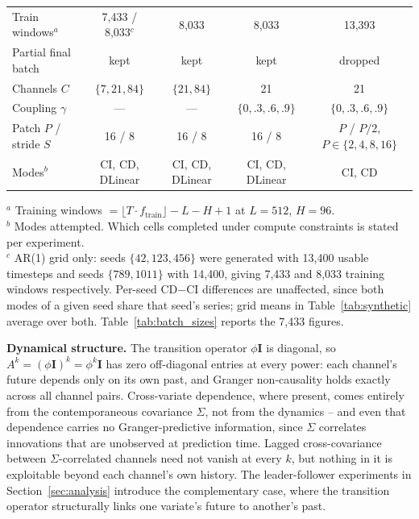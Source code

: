 \documentclass[10pt]{article} %
\begin{document}
\begin{table}[htbp]
{\begin{tabular}{lcccc}
            Train windows$^{a}$    & 7{,}433 / 8{,}033$^{c}$     & 8{,}033  & 8{,}033  & 13{,}393 \\
            Partial final batch    & kept                   & kept                        & kept                                     & dropped                                \\
            Channels $C$           & $\{7, 21, 84\}$        & $\{21, 84\}$                & 21                                       & 21                                     \\
            Coupling $\gamma$      & ---                    & ---                         & $\{0, .3, .6, .9\}$                      & $\{0, .3, .6, .9\}$                    \\
            Patch $P$ / stride $S$ & 16 / 8                 & 16 / 8                      & 16 / 8                                   & $P$ / $P/2$, $P \in \{2,4,8,16\}$      \\
            Modes$^{b}$            & CI, CD, DLinear        & CI, CD, DLinear             & CI, CD, DLinear                          & CI, CD                                 \\
                        \bottomrule
        \end{tabular}
        }

        \vspace{0.5em}
        {\footnotesize
            $^{a}$ Training windows $= \lfloor T \cdot f_{\text{train}} \rfloor - L - H + 1$ at $L = 512$, $H = 96$.\\
            $^{b}$ Modes attempted. Which cells completed under compute constraints is stated per experiment.\\
            $^{c}$ AR(1) grid only: seeds $\{42, 123, 456\}$ were generated with 13{,}400 usable timesteps and seeds
            $\{789, 1011\}$ with 14{,}400, giving 7{,}433 and 8{,}033 training windows respectively. Per-seed CD$-$CI
        differences are unaffected, since both modes of a given seed share that seed's series; grid means in
        Table~\ref{tab:synthetic} average over both. Table~\ref{tab:batch_sizes} reports the 7{,}433 figures.}
    \end{table}


    \textbf{Dynamical structure.} The transition operator $\phi\mathbf{I}$ is diagonal, so
    $A^k = (\phi\mathbf{I})^k = \phi^k \mathbf{I}$ has zero off-diagonal entries at every power: each channel's future depends
    only on its own past, and Granger non-causality holds exactly across all channel pairs. Cross-variate dependence, where
    present, comes entirely from the contemporaneous covariance $\Sigma$, not from the dynamics -- and even that dependence
    carries no Granger-predictive information, since $\Sigma$ correlates innovations that are unobserved at prediction time.
    Lagged cross-covariance between $\Sigma$-correlated channels need not vanish at every $k$, but nothing in it is exploitable
    beyond each channel's own history. The leader-follower experiments in Section~\ref{sec:analysis} introduce the complementary
    case, where the transition operator structurally links one variate's future to another's past.
\end{document}
